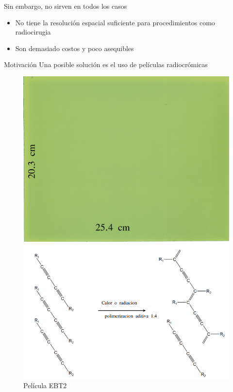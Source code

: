 \documentclass[12pt]{beamer}
\begin{document}
\begin{frame}
	Sin embargo, no sirven en todos los casos
	\begin{itemize}
		\item No tiene la resolución espacial suficiente para procedimientos como radiocirugia
		\item Son demasiado costos y poco asequibles 
	\end{itemize}
\end{frame}

\begin{frame}{Motivación}
	Una posible solución es el uso de películas radiocrómicas
\begin{figure}[htp]%
	\centering
	\begin{minipage}{0.45\textwidth}
		\includegraphics[width=\textwidth]{images/fondoblancoLandscape-1.png}
		\caption{Película EBT2}
	\end{minipage}\hfill
	\begin{minipage}{0.45\textwidth}
		\includegraphics[width=\textwidth]{images/reaccion.png}

\end{minipage}
\end{figure}
\end{frame}
\end{document}
